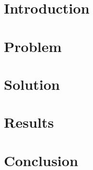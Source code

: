 
\section{Introduction}
\label{sec:introduction}


\section{Problem}
\label{sec:problem}
	


\section{Solution}
\label{sec:approach}


\section{Results}

\section{Conclusion}
\label{sec:conclusion}
